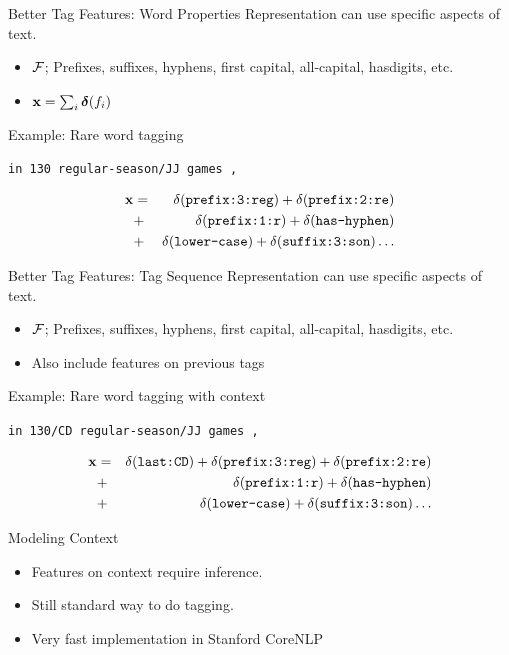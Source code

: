 \documentclass{beamer}
\begin{document}
\begin{frame}{Better Tag Features: Word Properties}
  Representation can use specific aspects of text.
  \begin{itemize}
  \item $\mathcal{F}$; Prefixes, suffixes, hyphens, first capital, all-capital, hasdigits, etc.
  \item $\mathbf{x} = \sum_{i} \boldsymbol{\delta}(f_i)$
  \end{itemize}

  Example: Rare word tagging

  \begin{center}
    \texttt{in 130 regular-season/JJ games ,}
  \end{center}
  \begin{eqnarray*}
    \mathbf{x} &=& \delta(\texttt{prefix:3:reg}) + \delta(\texttt{prefix:2:re}) \\
    &+& \delta(\texttt{prefix:1:r}) + \delta(\texttt{has-hyphen}) \\
    &+& \delta(\texttt{lower-case}) + \delta(\texttt{suffix:3:son}) \ldots
  \end{eqnarray*}
\end{frame}

\begin{frame}{Better Tag Features: Tag Sequence}
  Representation can use specific aspects of text.
  \begin{itemize}
  \item $\mathcal{F}$; Prefixes, suffixes, hyphens, first capital, all-capital, hasdigits, etc.
  \item \alert{Also} include features on previous tags
  \end{itemize}

  Example: Rare word tagging with context

  \begin{center}
    \texttt{in 130/CD regular-season/JJ games ,}
  \end{center}
  \begin{eqnarray*}
    \mathbf{x} &=& \delta(\texttt{last:CD}) + \delta(\texttt{prefix:3:reg}) + \delta(\texttt{prefix:2:re}) \\
    &+& \delta(\texttt{prefix:1:r}) + \delta(\texttt{has-hyphen}) \\
    &+& \delta(\texttt{lower-case}) + \delta(\texttt{suffix:3:son}) \ldots
  \end{eqnarray*}
\end{frame}

\begin{frame}{Modeling Context}
  \begin{itemize}
  \item Features on context require inference.
  \item Still standard way to do tagging.
  \item Very fast implementation in Stanford CoreNLP
  \end{itemize}
\end{frame}
\end{document}
